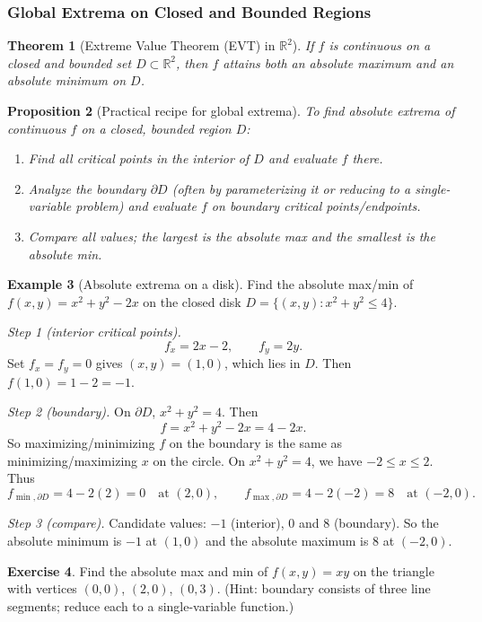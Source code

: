 \documentclass[12pt]{article}
\numberwithin{equation}{section}
\newcommand{\RR}{\mathbb{R}}
\theoremstyle{plain}
\newtheorem{theorem}{Theorem}[section]
\newtheorem{proposition}[theorem]{Proposition}
\theoremstyle{definition}
\newtheorem{example}[theorem]{Example}
\newtheorem{exercise}[theorem]{Exercise}
\theoremstyle{remark}
\begin{document}
\subsubsection{Global Extrema on Closed and Bounded Regions}

\begin{theorem}[Extreme Value Theorem (EVT) in $\RR^2$]\label{thm:evt}
If $f$ is continuous on a closed and bounded set $D\subset\RR^2$, then $f$ attains both an absolute maximum and an absolute minimum on $D$.
\end{theorem}

\begin{proposition}[Practical recipe for global extrema]\label{prop:global-recipe}
To find absolute extrema of continuous $f$ on a closed, bounded region $D$:
\begin{enumerate}[label=(\arabic*)]
\item Find all critical points in the interior of $D$ and evaluate $f$ there.
\item Analyze the boundary $\partial D$ (often by parameterizing it or reducing to a single-variable problem) and evaluate $f$ on boundary critical points/endpoints.
\item Compare all values; the largest is the absolute max and the smallest is the absolute min.
\end{enumerate}
\end{proposition}

\begin{example}[Absolute extrema on a disk]
Find the absolute max/min of $f(x,y)=x^2+y^2-2x$ on the closed disk $D=\{(x,y):x^2+y^2\le 4\}$.

\emph{Step 1 (interior critical points).}
\[
f_x=2x-2,\qquad f_y=2y.
\]
Set $f_x=f_y=0$ gives $(x,y)=(1,0)$, which lies in $D$. Then $f(1,0)=1-2=-1$.

\emph{Step 2 (boundary).} On $\partial D$, $x^2+y^2=4$. Then
\[
f=x^2+y^2-2x=4-2x.
\]
So maximizing/minimizing $f$ on the boundary is the same as minimizing/maximizing $x$ on the circle.
On $x^2+y^2=4$, we have $-2\le x\le 2$. Thus
\[
f_{\min,\partial D}=4-2(2)=0 \quad \text{at }(2,0),
\qquad
f_{\max,\partial D}=4-2(-2)=8 \quad \text{at }(-2,0).
\]

\emph{Step 3 (compare).} Candidate values: $-1$ (interior), $0$ and $8$ (boundary).  
So the absolute minimum is $-1$ at $(1,0)$ and the absolute maximum is $8$ at $(-2,0)$.
\end{example}

\begin{exercise}
Find the absolute max and min of $f(x,y)=xy$ on the triangle with vertices $(0,0)$, $(2,0)$, $(0,3)$.
(Hint: boundary consists of three line segments; reduce each to a single-variable function.)
\end{exercise}
\end{document}
